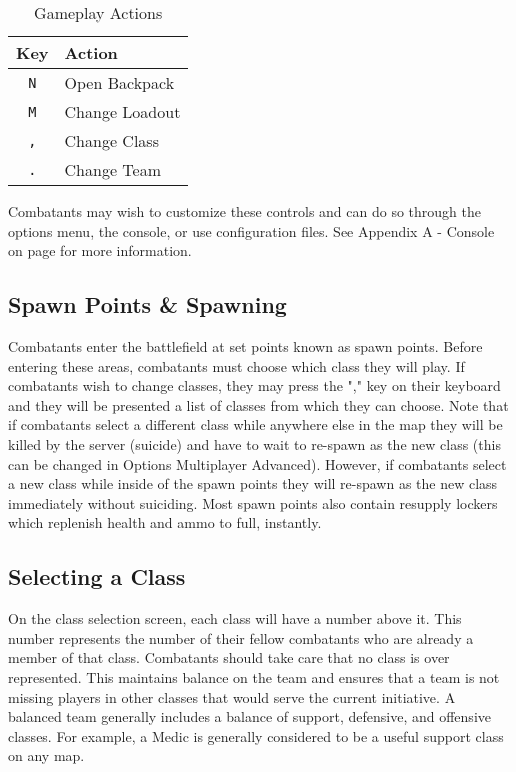 \begin{table}[h!b!p!]
\caption{Gameplay Actions}
\begin{center}
\begin{tabular}{|c|l|}
	\hline
		Key & Action\\
	\hline
	\texttt{N}&Open Backpack\\
	\texttt{M}&Change Loadout\\
	\texttt{,}&Change Class\\
	\texttt{.}&Change Team\\
  	\hline
\end{tabular}
\end{center}
\label{table_gameplay_actions}
\end{table}

Combatants may wish to customize these controls and can do so through the options menu, the console, or use configuration files. See Appendix A - Console on page \pageref{Appendix_A_Console} for more information.

\subsection{Spawn Points \& Spawning}
Combatants enter the battlefield at set points known as spawn points. Before entering these areas, combatants must choose which class they will play. If combatants wish to change classes, they may press the "," key on their keyboard and they will be presented a list of classes from which they can choose. Note that if combatants select a different class while anywhere else in the map they will be killed by the server (suicide) and have to wait to re-spawn as the new class (this can be changed in Options Multiplayer Advanced). However, if combatants select a new class while inside of the spawn points they will re-spawn as the new class immediately without suiciding. Most spawn points also contain resupply lockers which replenish health and ammo to full, instantly.

\subsection{Selecting a Class}
On the class selection screen, each class will have a number above it. This number represents the number of their fellow combatants who are already a member of that class. Combatants should take care that no class is over represented.  This maintains balance on the team and ensures that a team is not missing players in other classes that would serve the current initiative. A balanced team generally includes a balance of support, defensive, and offensive classes. For example, a Medic is generally considered to be a useful support class on any map.

